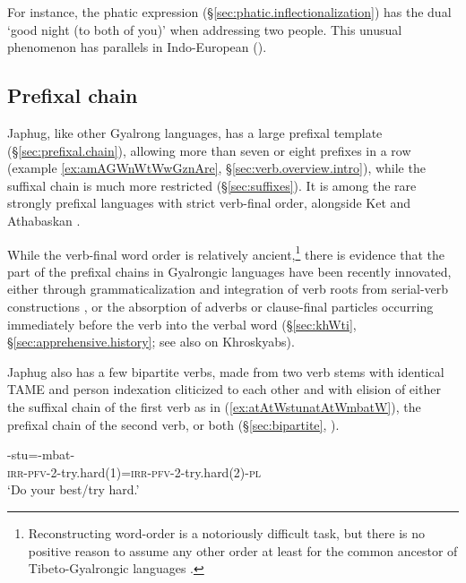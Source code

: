 For instance, the phatic expression  (§\ref{sec:phatic.inflectionalization}) has the dual  `good night (to both of you)' when addressing two people. This unusual phenomenon has parallels in Indo-European (\citealt[113--114]{viti15wandel}).

\subsection{Prefixal chain}
Japhug, like other Gyalrong languages, has a large prefixal template (§\ref{sec:prefixal.chain}), allowing more than seven or eight prefixes in a row (example \ref{ex:amAGWnWtWwGznAre}, §\ref{sec:verb.overview.intro}), while the suffixal chain is much more restricted (§\ref{sec:suffixes}). It is among the rare strongly prefixal languages with strict verb-final order, alongside Ket \citep{werner97ketisch} and Athabaskan \citep{rice2000scope}. 

While the verb-final word order is relatively ancient,\footnote{Reconstructing word-order is a notoriously difficult task, but there is no positive reason to assume any other order at least for the common ancestor of Tibeto-Gyalrongic languages \citep{Sagart19ST}. }
 there is evidence that the part of the prefixal chains in Gyalrongic languages have been recently innovated, either through grammaticalization and integration of verb roots from serial-verb constructions \citep{jacques13harmonization}, or the absorption of adverbs or clause-final particles occurring immediately before the verb into the verbal word (§\ref{sec:khWti}, §\ref{sec:apprehensive.history}; see also \citealt{laiyf20betrayal} on Khroskyabs).

Japhug also has a few bipartite verbs, made from two verb stems with identical TAME and person indexation cliticized to each other and with elision of either the suffixal chain of the first verb  as in (\ref{ex:atAtWstunatAtWmbatW}), the prefixal chain of the second verb, or both (§\ref{sec:bipartite}, \citealt{jacques18bipartite}).
 
\begin{exe}
\ex \label{ex:atAtWstunatAtWmbatW}
\gll {}-stu=-mbat-  \\
\textsc{irr}-\textsc{pfv}-\textsc{2}-try.hard(1)=\textsc{irr}-\textsc{pfv}-\textsc{2}-try.hard(2)-\textsc{pl} \\
\glt `Do your best/try hard.'  
\end{exe} 


